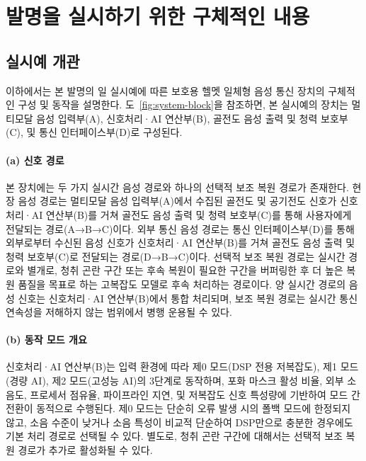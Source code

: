 \documentclass{article}
\begin{document}
\clearpage

\section{발명을 실시하기 위한 구체적인 내용}


\subsection{실시예 개관}

이하에서는 본 발명의 일 실시예에 따른 보호용 헬멧 일체형 음성 통신 장치의 구체적인 구성 및 동작을 설명한다. 도~\ref{fig:system-block}을 참조하면, 본 실시예의 장치는 멀티모달 음성 입력부(A), 신호처리·AI 연산부(B), 골전도 음성 출력 및 청력 보호부(C), 및 통신 인터페이스부(D)로 구성된다.

\paragraph{(a) 신호 경로}

본 장치에는 두 가지 실시간 음성 경로와 하나의 선택적 보조 복원 경로가 존재한다. 현장 음성 경로는 멀티모달 음성 입력부(A)에서 수집된 골전도 및 공기전도 신호가 신호처리·AI 연산부(B)를 거쳐 골전도 음성 출력 및 청력 보호부(C)를 통해 사용자에게 전달되는 경로(A→B→C)이다. 외부 통신 음성 경로는 통신 인터페이스부(D)를 통해 외부로부터 수신된 음성 신호가 신호처리·AI 연산부(B)를 거쳐 골전도 음성 출력 및 청력 보호부(C)로 전달되는 경로(D→B→C)이다. 선택적 보조 복원 경로는 실시간 경로와 별개로, 청취 곤란 구간 또는 후속 복원이 필요한 구간을 버퍼링한 후 더 높은 복원 품질을 목표로 하는 고복잡도 모델로 후속 처리하는 경로이다. 양 실시간 경로의 음성 신호는 신호처리·AI 연산부(B)에서 통합 처리되며, 보조 복원 경로는 실시간 통신 연속성을 저해하지 않는 범위에서 병행 운용될 수 있다.

\paragraph{(b) 동작 모드 개요}

신호처리·AI 연산부(B)는 입력 환경에 따라 제0 모드(DSP 전용 저복잡도), 제1 모드(경량 AI), 제2 모드(고성능 AI)의 3단계로 동작하며, 포화 마스크 활성 비율, 외부 소음도, 프로세서 점유율, 파이프라인 지연, 및 저복잡도 신호 특성량에 기반하여 모드 간 전환이 동적으로 수행된다. 제0 모드는 단순히 오류 발생 시의 폴백 모드에 한정되지 않고, 소음 수준이 낮거나 소음 특성이 비교적 단순하여 DSP만으로 충분한 경우에도 기본 처리 경로로 선택될 수 있다. 별도로, 청취 곤란 구간에 대해서는 선택적 보조 복원 경로가 추가로 활성화될 수 있다.
\end{document}
